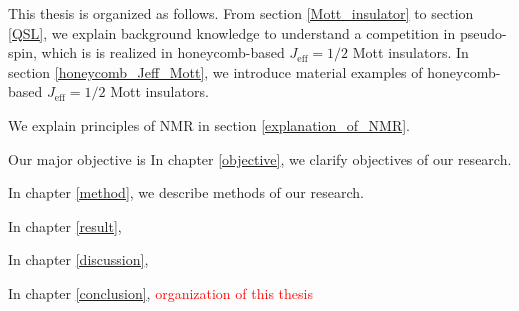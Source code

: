 \vspace{3mm}
This thesis is organized as follows.
From section \ref{Mott_insulator} to section \ref{QSL}, we explain background knowledge to understand a competition in pseudo-spin, which is is realized in honeycomb-based $J_\mathrm{eff} = 1/2$ Mott insulators.
In section \ref{honeycomb_Jeff_Mott}, we introduce material examples of honeycomb-based $J_\mathrm{eff} = 1/2$ Mott insulators.
\begin{comment}
In section \ref{Mott_insulator}, we explain a contentional $S = 1/2$ Mott insulator, which is helpful to understand a $J_\mathrm{eff} = 1/2$ Mott insulator as a comparison.
In section \ref{corr_and_SOI}, we explain what SOI is, how SOI induces $J_\mathrm{eff} = 1/2$ pseudo-spin in a $(4d)^5$ or $(5d)^5$ ion.
We discuss how a concept of $J_\mathrm{eff} = 1/2$ Mott insulator is experimentally established in Sr$_2$IrO$_4$, which is the first exmaple of $J_\mathrm{eff} = 1/2$ Mott insulator.
Interactions in $J_\mathrm{eff} = 1/2$ Mott insulator is discussed.
In section \ref{QSL}, we explain RVB QSL as an example of competition in $S = 1/2$ spin, which is helpful to understand a competition in $J_\mathrm{eff} = 1/2$ pseudo-spin as a comparison.
Then, we discuss a competition in $J_\mathrm{eff} = 1/2$ pseudo-spin, which is realized in honeycomb-based $J_\mathrm{eff} = 1/2$ Mott insulators and provides a route to Kitaev QSL.
\end{comment}
We explain principles of NMR in section \ref{explanation_of_NMR}.

Our major objective is
In chapter \ref{objective}, we clarify objectives of our research.

In chapter \ref{method}, we describe methods of our research.

In chapter \ref{result},

In chapter \ref{discussion},

In chapter \ref{conclusion},
\textcolor{red}{organization of this thesis}

